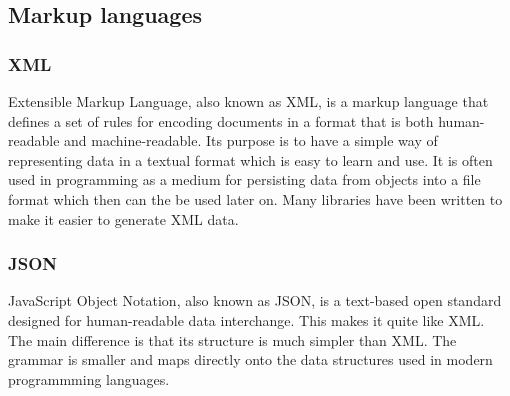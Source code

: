 \subsection{Markup languages}

\subsubsection{XML}
Extensible Markup Language, also known as XML, is a markup language that defines a set of rules for encoding documents in a format that is both human-readable and machine-readable\cite{bib:xml}. Its purpose is to have a simple way of representing data in a textual format which is easy to learn and use. It is often used in programming as a medium for persisting data from objects into a file format which then can the be used later on. Many libraries have been written to make it easier to generate XML data.

\subsubsection{JSON}
JavaScript Object Notation, also known as JSON, is a text-based open standard designed for human-readable data interchange. This makes it quite like XML. The main difference is that its structure is much simpler than XML. The grammar is smaller and maps directly onto the data structures used in modern programmming languages\cite{bib:json}.


